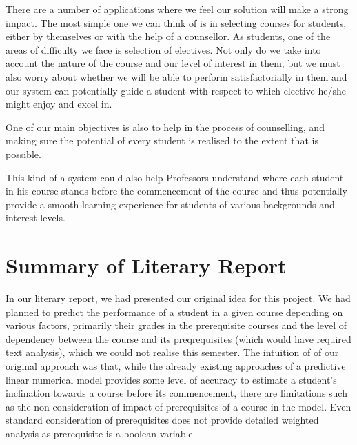 \documentclass[conference]{IEEEtran}
\begin{document}

There are a number of applications where we feel our solution will make a strong impact. The most simple one we can think of is in selecting courses for students, either by themselves or with the help of a counsellor. As students, one of the areas of difficulty we face is selection of electives. Not only do we take into account the nature of the course and our level of interest in them, but we must also worry about whether we will be able to perform satisfactorially in them and our system can potentially guide a student with respect to which elective he/she might enjoy and excel in.

One of our main objectives is also to help in the process of counselling, and making sure the potential of every student is realised to the extent that is possible. 

This kind of a system could also help Professors understand where each student in his course stands before the commencement of the course and thus potentially provide a smooth learning experience for students of various backgrounds and interest levels.


	\section{Summary of Literary Report}

In our literary report, we had presented our original idea for this project. We had planned to predict the performance of a student in a given course depending on various factors, primarily their grades in the prerequisite courses and the level of dependency between the course and its preqrequisites (which would have required text analysis), which we could not realise this semester.
The intuition of of our original approach was that, 
while the already existing approaches of a predictive linear numerical model provides some level of accuracy to estimate a student's inclination towards a course before its commencement, there are limitations such as the non-consideration of impact of prerequisites of a course in the model. Even standard consideration of prerequisites does not provide detailed weighted analysis as prerequisite is a boolean variable.
\end{document}
